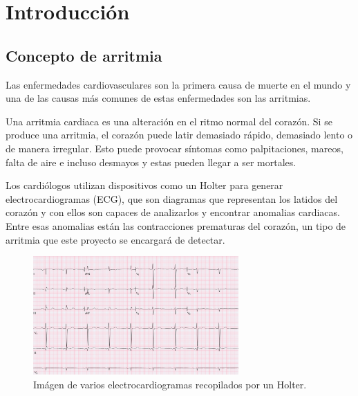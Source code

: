 \titlespacing*{\chapter}{0pt}{-1.25cm}{25pt}
\chapter{Introducción}
\section{Concepto de arritmia}
Las enfermedades cardiovasculares son la primera causa de muerte en el mundo y una de las causas más comunes
de estas enfermedades son las arritmias.

Una arritmia cardiaca es una alteración en el ritmo normal del corazón. Si se produce una arritmia, el corazón 
puede latir demasiado rápido, demasiado lento o de manera irregular. Esto puede provocar síntomas como palpitaciones,
mareos, falta de aire e incluso desmayos y estas pueden llegar a ser mortales.

Los cardiólogos utilizan dispositivos como un Holter para generar electrocardiogramas (ECG), que son 
diagramas que representan los latidos del corazón y con ellos son capaces de analizarlos y encontrar anomalias cardiacas.
Entre esas anomalias están las contracciones prematuras del corazón, un tipo de arritmia que este proyecto se encargará de detectar. 

\begin{figure}[h!]
	\centering
	\includegraphics[width=0.7\textwidth]{./Images/img_introduccion/electrocardiograma.png}
	\caption{Imágen de varios electrocardiogramas recopilados por un Holter.}
	\label{fig:electrocardiogramas}
\end{figure}

